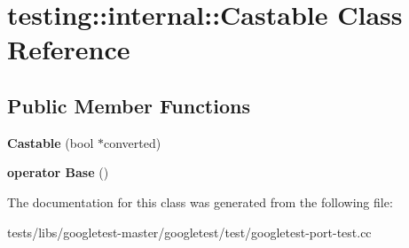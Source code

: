 \hypertarget{classtesting_1_1internal_1_1Castable}{}\section{testing\+:\+:internal\+:\+:Castable Class Reference}
\label{classtesting_1_1internal_1_1Castable}
\subsection*{Public Member Functions}
\begin{DoxyCompactItemize}
\item 
\mbox{\label{classtesting_1_1internal_1_1Castable_a705d519a227d38ff5c174905316f62c4}} 
{\bfseries Castable} (bool $\ast$converted)
\item 
\mbox{\label{classtesting_1_1internal_1_1Castable_ac60b2e7885f3b09defb829eddaa0afd9}} 
{\bfseries operator Base} ()
\end{DoxyCompactItemize}


The documentation for this class was generated from the following file\+:\begin{DoxyCompactItemize}
\item 
tests/libs/googletest-\/master/googletest/test/googletest-\/port-\/test.\+cc\end{DoxyCompactItemize}
